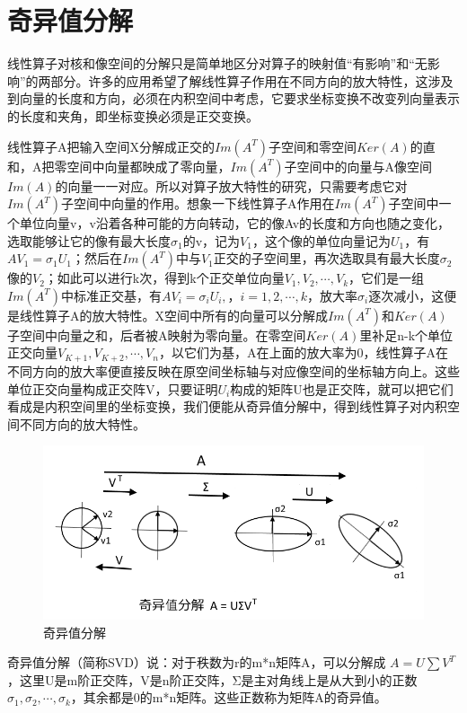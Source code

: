 \section{奇异值分解}

线性算子对核和像空间的分解只是简单地区分对算子的映射值``有影响''和``无影响''的两部分。许多的应用希望了解线性算子作用在不同方向的放大特性，这涉及到向量的长度和方向，必须在内积空间中考虑，它要求坐标变换不改变列向量表示的长度和夹角，即坐标变换必须是正交变换。

线性算子A把输入空间X分解成正交的$ Im(A^T) $子空间和零空间$ Ker(A) $的直和，A把零空间中向量都映成了零向量，$ Im(A^T) $子空间中的向量与A像空间$ Im(A) $的向量一一对应。所以对算子放大特性的研究，只需要考虑它对$ Im(A^T) $子空间中向量的作用。想象一下线性算子A作用在$ Im(A^T) $子空间中一个单位向量v，v沿着各种可能的方向转动，它的像Av的长度和方向也随之变化，选取能够让它的像有最大长度$ \sigma_1 $的v，记为$ V_1 $，这个像的单位向量记为$ U_1 $，有$ AV_1=\sigma_1U_1 $；然后在$ Im(A^T) $中与$ V_1 $正交的子空间里，再次选取具有最大长度$ \sigma_2 $像的$ V_2 $；如此可以进行k次，得到k个正交单位向量$ {V_1,V_2,\cdots,V_k} $，它们是一组$ Im(A^T) $中标准正交基，有$ AV_i =\sigma_iU_i,，i=1, 2, \cdots,k $，放大率$ σ_i $逐次减小，这便是线性算子A的放大特性。X空间中所有的向量可以分解成$ Im(A^T) $和$ Ker(A) $子空间中向量之和，后者被A映射为零向量。在零空间$ Ker(A) $里补足n-k个单位正交向量$ {V_{K+1},V_{K+2}, \cdots,V_n} $，以它们为基，A在上面的放大率为0，线性算子A在不同方向的放大率便直接反映在原空间坐标轴与对应像空间的坐标轴方向上。这些单位正交向量构成正交阵V，只要证明$ U_i $构成的矩阵U也是正交阵，就可以把它们看成是内积空间里的坐标变换，我们便能从奇异值分解中，得到线性算子对内积空间不同方向的放大特性。


\begin{figure}[h]
	\centering
	\includegraphics[width=0.7\linewidth]{pic/20450596leeoio001j6199.png}
	\caption{奇异值分解}
	\label{fig:20450596leeoio001j6199}
\end{figure}

\kaishu

奇异值分解（简称SVD）说：对于秩数为r的m*n矩阵A，可以分解成 $ A = U\sum V^T $，这里U是m阶正交阵，V是n阶正交阵，Σ是主对角线上是从大到小的正数$ \sigma_1,\sigma_2, \cdots , \sigma_k $，其余都是0的m*n矩阵。这些正数称为矩阵A的奇异值。

